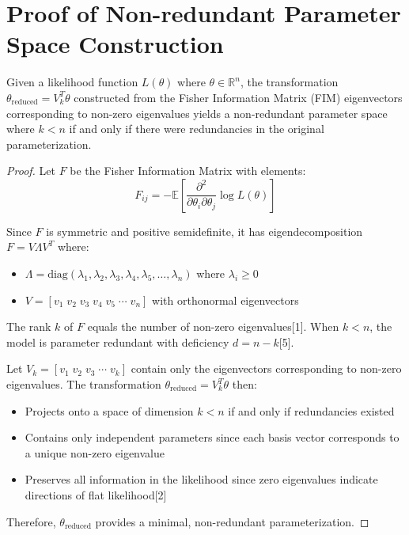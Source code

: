 \documentclass{article}
\begin{document}
\section{Proof of Non-redundant Parameter Space Construction}

\begin{theorem}
Given a likelihood function $L(\theta)$ where $\theta \in \mathbb{R}^n$, the transformation $\theta_{\text{reduced}} = V_k^T\theta$ constructed from the Fisher Information Matrix (FIM) eigenvectors corresponding to non-zero eigenvalues yields a non-redundant parameter space where $k < n$ if and only if there were redundancies in the original parameterization.
\end{theorem}

\begin{proof}
Let $F$ be the Fisher Information Matrix with elements:
$$F_{ij} = -\mathbb{E}\left[\frac{\partial^2}{\partial \theta_i \partial \theta_j} \log L(\theta)\right]$$

Since $F$ is symmetric and positive semidefinite, it has eigendecomposition $F = V\Lambda V^T$ where:
\begin{itemize}
    \item $\Lambda = \text{diag}(\lambda_1, \lambda_2, \lambda_3, \lambda_4, \lambda_5, \ldots, \lambda_n)$ where $\lambda_i \geq 0$
    \item $V = [v_1 \; v_2 \; v_3 \; v_4 \; v_5 \; \cdots \; v_n]$ with orthonormal eigenvectors
\end{itemize}

The rank $k$ of $F$ equals the number of non-zero eigenvalues[1]. When $k < n$, the model is parameter redundant with deficiency $d = n - k$[5]. 

Let $V_k = [v_1 \; v_2 \; v_3 \; \cdots \; v_k]$ contain only the eigenvectors corresponding to non-zero eigenvalues. The transformation $\theta_{\text{reduced}} = V_k^T\theta$ then:
\begin{itemize}
    \item Projects onto a space of dimension $k < n$ if and only if redundancies existed
    \item Contains only independent parameters since each basis vector corresponds to a unique non-zero eigenvalue
    \item Preserves all information in the likelihood since zero eigenvalues indicate directions of flat likelihood[2]
\end{itemize}

Therefore, $\theta_{\text{reduced}}$ provides a minimal, non-redundant parameterization.
\end{proof}
\end{document}
